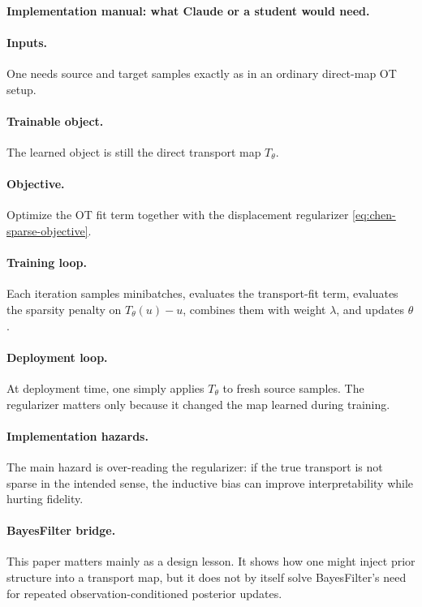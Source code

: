 \documentclass[11pt]{report}
\begin{document}
\paragraph{Implementation manual: what Claude or a student would need.}
\paragraph{Inputs.}
One needs source and target samples exactly as in an ordinary direct-map OT setup.

\paragraph{Trainable object.}
The learned object is still the direct transport map $T_\theta$.

\paragraph{Objective.}
Optimize the OT fit term together with the displacement regularizer
\eqref{eq:chen-sparse-objective}.

\paragraph{Training loop.}
Each iteration samples minibatches, evaluates the transport-fit term, evaluates the
sparsity penalty on $T_\theta(u)-u$, combines them with weight $\lambda$, and
updates $\theta$.

\paragraph{Deployment loop.}
At deployment time, one simply applies $T_\theta$ to fresh source samples.  The
regularizer matters only because it changed the map learned during training.

\paragraph{Implementation hazards.}
The main hazard is over-reading the regularizer: if the true transport is not sparse
in the intended sense, the inductive bias can improve interpretability while hurting
fidelity.

\paragraph{BayesFilter bridge.}
This paper matters mainly as a design lesson.  It shows how one might inject prior
structure into a transport map, but it does not by itself solve BayesFilter's need
for repeated observation-conditioned posterior updates.
\end{document}
